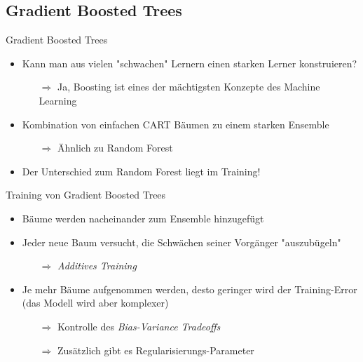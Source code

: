 \subsection{Gradient Boosted Trees}

\begin{frame}{Gradient Boosted Trees}
    \begin{itemize}
        \item Kann man aus vielen "schwachen" Lernern einen starken Lerner konstruieren?
            \begin{itemize}
                \item[$\Rightarrow$] Ja, Boosting ist eines der m\"achtigsten Konzepte des Machine Learning \cite{elements}
            \end{itemize}
        \item Kombination von einfachen CART B\"aumen zu einem starken Ensemble
            \begin{itemize}
                \item[$\Rightarrow$] \"Ahnlich zu Random Forest
            \end{itemize}
        \item Der Unterschied zum Random Forest liegt im Training!
    \end{itemize}
\end{frame}

\begin{frame}{Training von Gradient Boosted Trees}
    \begin{itemize}
        \item B\"aume werden nacheinander zum Ensemble hinzugef\"ugt
        \item Jeder neue Baum versucht, die Schw\"achen seiner Vorg\"anger "auszub\"ugeln"
            \begin{itemize}
                \item[$\Rightarrow$] \textit{Additives Training}
            \end{itemize}
        \item Je mehr B\"aume aufgenommen werden, desto geringer wird der Training-Error (das Modell wird aber komplexer)
            \begin{itemize}
                \item[$\Rightarrow$] Kontrolle des \textit{Bias-Variance Tradeoffs}
                \item[$\Rightarrow$] Zus\"atzlich gibt es Regularisierungs-Parameter
            \end{itemize}
    \end{itemize}
\end{frame}


